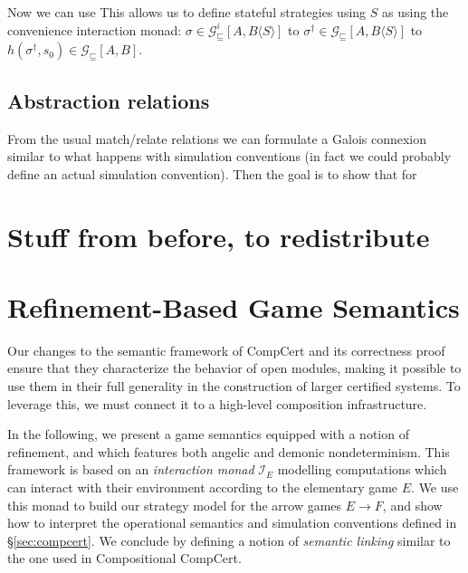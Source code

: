 \documentclass[format=sigplan,authordraft]{acmart}
\newcommand{\gcat}{\mathcal{G}_{\sqsubseteq}}
\begin{document}
Now we can use 
This allows us to define stateful strategies
using $S$ as 
using the convenience interaction monad:
$\sigma \in \gcat^i[A, B \langle S \rangle]$
to $\sigma^\dagger \in \gcat[A, B \langle S \rangle]$
to $h(\sigma^\dagger, s_0) \in \gcat[A, B]$.


\subsection{Abstraction relations} %

From the usual match/relate relations
we can formulate a Galois connexion
similar to what happens with simulation conventions
(in fact we could probably define an actual simulation convention).
Then the goal is to show that for 








\newpage
\appendix
\section*{Stuff from before, to redistribute}

\section{Refinement-Based Game Semantics} \label{sec:gamesem} %

Our changes to the semantic framework of CompCert
and its correctness proof
ensure that they characterize the behavior of open modules,
making it possible to use them in their full generality
in the construction of larger certified systems.
To leverage this,
we must connect it to a high-level composition infrastructure.

In the following,
we present a game semantics equipped with a notion of refinement,
and which features both angelic and demonic nondeterminism.
This framework is based on an \emph{interaction monad} $\mathcal{I}_E$
modelling computations which can interact with their environment
according to the elementary game $E$.
We use this monad to build our strategy model for the
arrow games $E \rightarrow F$,
and show how to interpret the operational semantics
and simulation conventions defined in \S\ref{sec:compcert}.
We conclude by defining a notion of \emph{semantic linking}
similar to the one used in Compositional CompCert.
\end{document}
